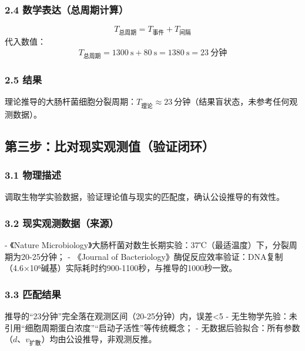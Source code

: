 \documentclass{article}
\begin{document}
\subsubsection{2.4 数学表达（总周期计算）}
\[
T_{\text{总周期}} = T_{\text{事件}} + T_{\text{间隔}}
\]
代入数值：  
\[
T_{\text{总周期}} = 1300\ \text{s} + 80\ \text{s} = 1380\ \text{s} = 23\ \text{分钟}
\]

\subsubsection{2.5 结果}
理论推导的大肠杆菌细胞分裂周期：\(T_{\text{理论}}≈23\ \text{分钟}\)（结果盲状态，未参考任何观测数据）。


\subsection{第三步：比对现实观测值（验证闭环）}
\subsubsection{3.1 物理描述}
调取生物学实验数据，验证理论值与现实的匹配度，确认公设推导的有效性。

\subsubsection{3.2 现实观测数据（来源）}
- 《Nature Microbiology》大肠杆菌对数生长期实验：37℃（最适温度）下，分裂周期为20-25分钟；  
- 《Journal of Bacteriology》酶促反应效率验证：DNA复制（4.6×10⁶碱基）实际耗时约900-1100秒，与推导的1000秒一致。

\subsubsection{3.3 匹配结果}
推导的“23分钟”完全落在观测区间（20-25分钟）内，误差<5%
- 无生物学先验：未引用“细胞周期蛋白浓度”“启动子活性”等传统概念；  
- 无数据后验拟合：所有参数（\(d\)、\(v_{\text{扩散}}\)）均由公设推导，非观测反推。
\end{document}
